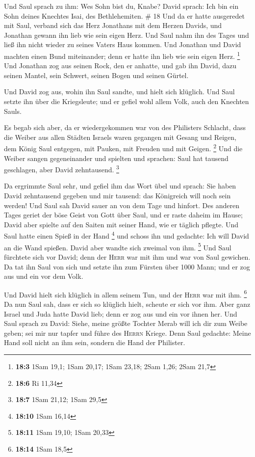  Und Saul sprach zu ihm: Wes Sohn bist du, Knabe? David
sprach: Ich bin ein Sohn deines Knechtes Isai, des Bethlehemiten. \# 18
 Und da er hatte ausgeredet mit Saul, verband sich das
Herz Jonathans mit dem Herzen Davids, und Jonathan gewann ihn lieb wie
sein eigen Herz.  Und Saul nahm ihn des Tages und ließ ihn
nicht wieder zu seines Vaters Haus kommen.  Und Jonathan
und David machten einen Bund miteinander; denn er hatte ihn lieb wie
sein eigen Herz. \footnote{\textbf{18:3} 1Sam 19,1; 1Sam 20,17; 1Sam
  23,18; 2Sam 1,26; 2Sam 21,7}  Und Jonathan zog aus
seinen Rock, den er anhatte, und gab ihn David, dazu seinen Mantel, sein
Schwert, seinen Bogen und seinen Gürtel.

 Und David zog aus, wohin ihn Saul sandte, und hielt sich
klüglich. Und Saul setzte ihn über die Kriegsleute; und er gefiel wohl
allem Volk, auch den Knechten Sauls.

 Es begab sich aber, da er wiedergekommen war von des
Philisters Schlacht, dass die Weiber aus allen Städten Israels waren
gegangen mit Gesang und Reigen, dem König Saul entgegen, mit Pauken, mit
Freuden und mit Geigen. \footnote{\textbf{18:6} Ri 11,34} 
Und die Weiber sangen gegeneinander und spielten und sprachen: Saul hat
tausend geschlagen, aber David zehntausend. \footnote{\textbf{18:7} 1Sam
  21,12; 1Sam 29,5}

 Da ergrimmte Saul sehr, und gefiel ihm das Wort übel und
sprach: Sie haben David zehntausend gegeben und mir tausend: das
Königreich will noch sein werden!  Und Saul sah David
sauer an von dem Tage und hinfort.  Des anderen Tages
geriet der böse Geist von Gott über Saul, und er raste daheim im Hause;
David aber spielte auf den Saiten mit seiner Hand, wie er täglich
pflegte. Und Saul hatte einen Spieß in der Hand \footnote{\textbf{18:10}
  1Sam 16,14}  und schoss ihn und gedachte: Ich will
David an die Wand spießen. David aber wandte sich zweimal von ihm.
\footnote{\textbf{18:11} 1Sam 19,10; 1Sam 20,33}  Und
Saul fürchtete sich vor David; denn der \textsc{Herr} war mit ihm und
war von Saul gewichen.  Da tat ihn Saul von sich und
setzte ihn zum Fürsten über 1000 Mann; und er zog aus und ein vor dem
Volk.

 Und David hielt sich klüglich in allem seinem Tun, und
der \textsc{Herr} war mit ihm. \footnote{\textbf{18:14} 1Sam 18,5}
 Da nun Saul sah, dass er sich so klüglich hielt, scheute
er sich vor ihm.  Aber ganz Israel und Juda hatte David
lieb; denn er zog aus und ein vor ihnen her.  Und Saul
sprach zu David: Siehe, meine größte Tochter Merab will ich dir zum
Weibe geben; sei mir nur tapfer und führe des \textsc{Herrn} Kriege.
Denn Saul gedachte: Meine Hand soll nicht an ihm sein, sondern die Hand
der Philister.

